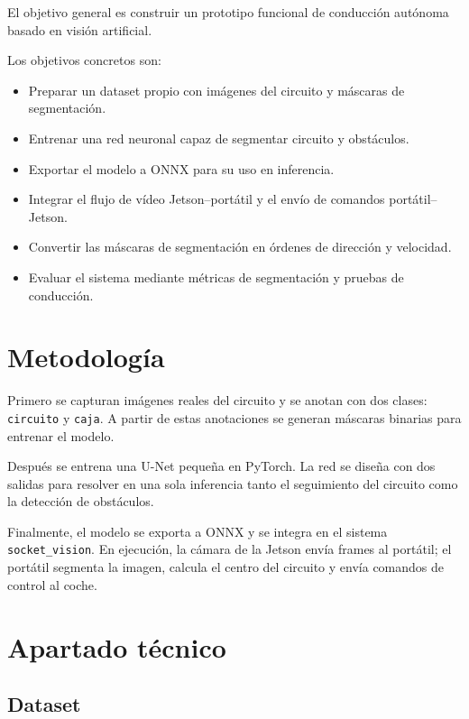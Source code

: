 \documentclass{article}
\begin{document}
El objetivo general es construir un prototipo funcional de conducci\'on aut\'onoma basado en visi\'on artificial.

Los objetivos concretos son:

\begin{itemize}
    \item Preparar un dataset propio con im\'agenes del circuito y m\'ascaras de segmentaci\'on.
    \item Entrenar una red neuronal capaz de segmentar circuito y obst\'aculos.
    \item Exportar el modelo a ONNX para su uso en inferencia.
    \item Integrar el flujo de v\'ideo Jetson--port\'atil y el env\'io de comandos port\'atil--Jetson.
    \item Convertir las m\'ascaras de segmentaci\'on en \'ordenes de direcci\'on y velocidad.
    \item Evaluar el sistema mediante m\'etricas de segmentaci\'on y pruebas de conducci\'on.
\end{itemize}

\section{Metodolog\'ia}

Primero se capturan im\'agenes reales del circuito y se anotan con dos clases: \texttt{circuito} y \texttt{caja}. A partir de estas anotaciones se generan m\'ascaras binarias para entrenar el modelo.

Despu\'es se entrena una U-Net peque\~na en PyTorch. La red se dise\~na con dos salidas para resolver en una sola inferencia tanto el seguimiento del circuito como la detecci\'on de obst\'aculos.

Finalmente, el modelo se exporta a ONNX y se integra en el sistema \texttt{socket\_vision}. En ejecuci\'on, la c\'amara de la Jetson env\'ia frames al port\'atil; el port\'atil segmenta la imagen, calcula el centro del circuito y env\'ia comandos de control al coche.

\section{Apartado t\'ecnico}

\subsection{Dataset}
\end{document}

